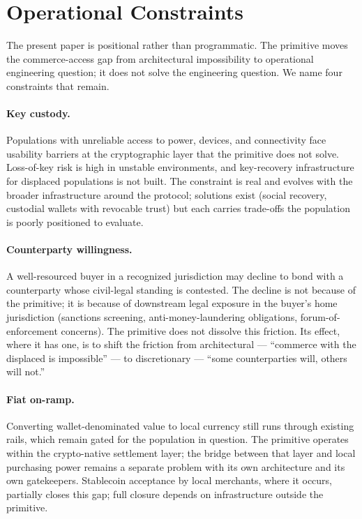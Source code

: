 \documentclass[11pt,a4paper]{article}
\theoremstyle{remark}
\begin{document}
\section{Operational Constraints}
\label{sec:constraints}

The present paper is positional rather than programmatic. The
primitive moves the commerce-access gap from architectural
impossibility to operational engineering question; it does not
solve the engineering question. We name four constraints that
remain.

\paragraph{Key custody.}
Populations with unreliable access to power, devices, and
connectivity face usability barriers at the cryptographic layer
that the primitive does not solve. Loss-of-key risk is high in
unstable environments, and key-recovery infrastructure for
displaced populations is not built. The constraint is real and
evolves with the broader infrastructure around the protocol;
solutions exist (social recovery, custodial wallets with
revocable trust) but each carries trade-offs the population is
poorly positioned to evaluate.

\paragraph{Counterparty willingness.}
A well-resourced buyer in a recognized jurisdiction may decline
to bond with a counterparty whose civil-legal standing is
contested. The decline is not because of the primitive; it is
because of downstream legal exposure in the buyer's home
jurisdiction (sanctions screening, anti-money-laundering
obligations, forum-of-enforcement concerns). The primitive does
not dissolve this friction. Its effect, where it has one, is to
shift the friction from architectural --- ``commerce with the
displaced is impossible'' --- to discretionary --- ``some
counterparties will, others will not.''

\paragraph{Fiat on-ramp.}
Converting wallet-denominated value to local currency still runs
through existing rails, which remain gated for the population in
question. The primitive operates within the crypto-native
settlement layer; the bridge between that layer and local
purchasing power remains a separate problem with its own
architecture and its own gatekeepers. Stablecoin acceptance by
local merchants, where it occurs, partially closes this gap; full
closure depends on infrastructure outside the primitive.
\end{document}
